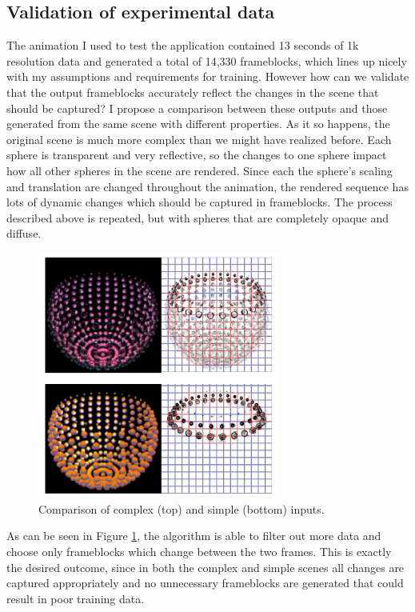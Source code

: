 \documentclass[conference]{IEEEtran}
\begin{document}
\subsection{Validation of experimental data}
\label{subsec:data_analysis}
The animation I used to test the application
contained 13 seconds of 1k resolution data and generated
a total of 14,330 frameblocks, which lines up nicely with my assumptions and
requirements for training. However how can we validate that the output frameblocks
accurately reflect the changes in the scene that should be captured?
I propose a comparison between these outputs and those generated from the same
scene with different properties.
As it so happens, the original scene is much more complex than we might have realized before.
Each sphere is transparent and very reflective,
so the changes to one sphere impact how all other spheres in the scene are
rendered.
Since each the sphere's scaling and translation are changed throughout the
animation, the rendered sequence has lots of dynamic changes which should be
captured in frameblocks.
The process described above is repeated, but with
spheres that are completely opaque and diffuse.

\begin{figure}[htbp]
\centerline{\includegraphics[width=8cm]{data_analysis.png}}
\caption{Comparison of complex (top) and simple (bottom) inputs.}
\label{fig:data_analysis}
\end{figure}

As can be seen in Figure \ref{fig:data_analysis}, the algorithm is able to filter
out more data and choose only frameblocks which change between the two frames.
This is exactly the desired outcome, since in both the complex and simple
scenes all changes are captured appropriately and no unnecessary frameblocks are
generated that could result in poor training data.
\end{document}
